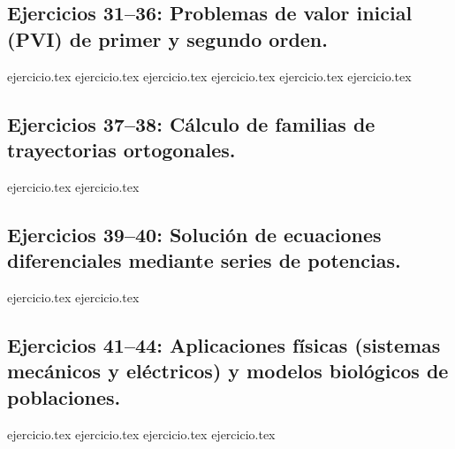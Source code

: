 \subsection*{Ejercicios 31--36: Problemas de valor inicial (PVI) de primer y segundo orden.}
\begin{enumerate}
    \setcounter{enumi}{30}
    {ejercicio.tex}
    {ejercicio.tex}
    {ejercicio.tex}
    {ejercicio.tex}
    {ejercicio.tex}
    {ejercicio.tex}
\end{enumerate}

\subsection*{Ejercicios 37--38: Cálculo de familias de trayectorias ortogonales.}
\begin{enumerate}
    \setcounter{enumi}{36}
    {ejercicio.tex}
    {ejercicio.tex}
\end{enumerate}

\subsection*{Ejercicios 39--40: Solución de ecuaciones diferenciales mediante series de potencias.}
\begin{enumerate}
    \setcounter{enumi}{38}
    {ejercicio.tex}
    {ejercicio.tex}
\end{enumerate}

\subsection*{Ejercicios 41--44: Aplicaciones físicas (sistemas mecánicos y eléctricos) y modelos biológicos de poblaciones.}
\begin{enumerate}
    \setcounter{enumi}{40}
    {ejercicio.tex}
    {ejercicio.tex}
    {ejercicio.tex}
    {ejercicio.tex}
\end{enumerate}
